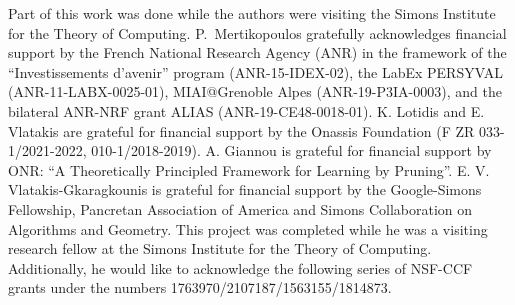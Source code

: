%
%
Part of this work was done while the authors were visiting the Simons Institute for the Theory of Computing.
P.~Mertikopoulos gratefully acknowledges financial support by
the French National Research Agency (ANR) in the framework of
the ``Investissements d'avenir'' program (ANR-15-IDEX-02),
the LabEx PERSYVAL (ANR-11-LABX-0025-01),
MIAI@Grenoble Alpes (ANR-19-P3IA-0003),
and the bilateral ANR-NRF grant ALIAS (ANR-19-CE48-0018-01). K. Lotidis and E. Vlatakis are grateful for financial support by the Onassis Foundation (F ZR 033-1/2021-2022, 010-1/2018-2019).
A. Giannou is grateful for financial support by  ONR: “A Theoretically Principled Framework for Learning by Pruning”.
E. V. Vlatakis-Gkaragkounis is grateful for financial support by the Google-Simons Fellowship, Pancretan Association of America and Simons Collaboration on Algorithms and Geometry. This project was completed while he was a visiting research fellow at the Simons Institute for the Theory of Computing. Additionally, he would like to acknowledge the following series of NSF-CCF grants under the numbers 1763970/2107187/1563155/1814873.
